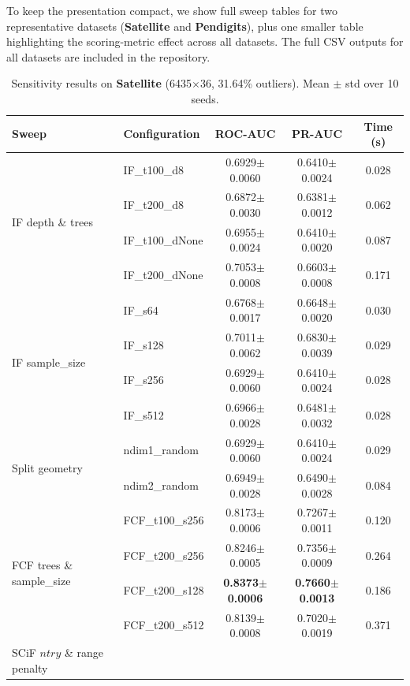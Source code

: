 To keep the presentation compact, we show full sweep tables for two representative datasets (\textbf{Satellite} and \textbf{Pendigits}), plus one smaller table highlighting the scoring-metric effect across all datasets. The full CSV outputs for all datasets are included in the repository.

\begin{table}[t]
\centering
\caption{Sensitivity results on \textbf{Satellite} (6435$\times$36, 31.64\% outliers). Mean $\pm$ std over 10 seeds.}
\label{tab:sens-satellite}
\scriptsize
\setlength{\tabcolsep}{4.5pt}
\renewcommand{\arraystretch}{1.15}
\begin{tabular}{llccc}
\toprule
Sweep & Configuration & ROC-AUC & PR-AUC & Time (s) \\
\midrule
\multirow{4}{*}{IF depth \& trees}
& IF\_t100\_d8    & 0.6929$\pm$0.0060 & 0.6410$\pm$0.0024 & 0.028 \\
& IF\_t200\_d8    & 0.6872$\pm$0.0030 & 0.6381$\pm$0.0012 & 0.062 \\
& IF\_t100\_dNone & 0.6955$\pm$0.0024 & 0.6410$\pm$0.0020 & 0.087 \\
& IF\_t200\_dNone & 0.7053$\pm$0.0008 & 0.6603$\pm$0.0008 & 0.171 \\
\midrule
\multirow{4}{*}{IF sample\_size}
& IF\_s64  & 0.6768$\pm$0.0017 & 0.6648$\pm$0.0020 & 0.030 \\
& IF\_s128 & 0.7011$\pm$0.0062 & 0.6830$\pm$0.0039 & 0.029 \\
& IF\_s256 & 0.6929$\pm$0.0060 & 0.6410$\pm$0.0024 & 0.028 \\
& IF\_s512 & 0.6966$\pm$0.0028 & 0.6481$\pm$0.0032 & 0.028 \\
\midrule
\multirow{2}{*}{Split geometry}
& ndim1\_random & 0.6929$\pm$0.0060 & 0.6410$\pm$0.0024 & 0.029 \\
& ndim2\_random & 0.6949$\pm$0.0028 & 0.6490$\pm$0.0028 & 0.084 \\
\midrule
\multirow{4}{*}{FCF trees \& sample\_size}
& FCF\_t100\_s256 & 0.8173$\pm$0.0006 & 0.7267$\pm$0.0011 & 0.120 \\
& FCF\_t200\_s256 & 0.8246$\pm$0.0005 & 0.7356$\pm$0.0009 & 0.264 \\
& FCF\_t200\_s128 & \textbf{0.8373$\pm$0.0006} & \textbf{0.7660$\pm$0.0013} & 0.186 \\
& FCF\_t200\_s512 & 0.8139$\pm$0.0008 & 0.7020$\pm$0.0019 & 0.371 \\
\midrule
\multirow{3}{*}{SCiF $ntry$ \& range penalty}

\end{tabular}
\end{table}
